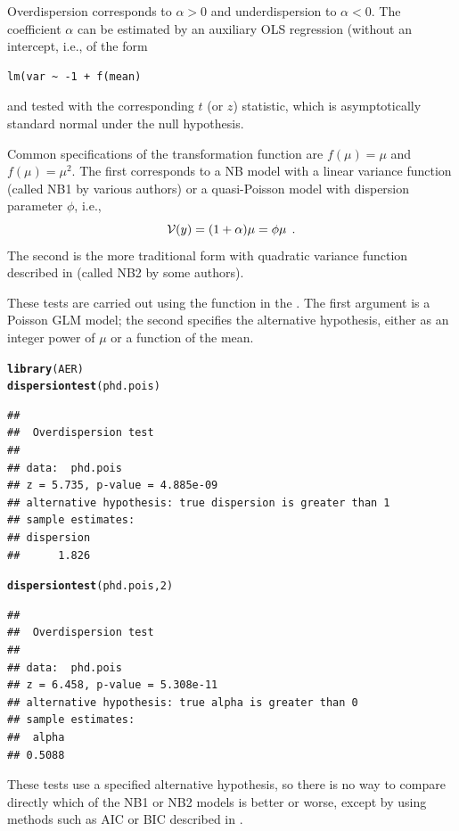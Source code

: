\documentclass[11pt]{book}\usepackage[]{graphicx}\usepackage[]{color}
\makeatletter
\newcommand{\hlnum}[1]{\textcolor[rgb]{0.686,0.059,0.569}{#1}}%
\newcommand{\hlstd}[1]{\textcolor[rgb]{0.345,0.345,0.345}{#1}}%
\newcommand{\hlkwd}[1]{\textcolor[rgb]{0.737,0.353,0.396}{\textbf{#1}}}%
\newenvironment{kframe}{%
 \def\at@end@of@kframe{}%
 \ifinner\ifhmode%
  \def\at@end@of@kframe{\end{minipage}}%
  \begin{minipage}{\columnwidth}%
 \fi\fi%
 \def\FrameCommand##1{\hskip\@totalleftmargin \hskip-\fboxsep
 \colorbox{shadecolor}{##1}\hskip-\fboxsep
     \hskip-\linewidth \hskip-\@totalleftmargin \hskip\columnwidth}%
 \MakeFramed {\advance\hsize-\width
   \@totalleftmargin\z@ \linewidth\hsize
   \@setminipage}}%
 {\par\unskip\endMakeFramed%
 \at@end@of@kframe}
\newenvironment{knitrout}{}{} %
\renewenvironment{knitrout}{\small\renewcommand{\baselinestretch}{.85}}{} %
\makeatother
\begin{document}
Overdispersion corresponds to $\alpha > 0$ and underdispersion to $\alpha < 0$. 
The coefficient $\alpha$ can be estimated by an auxiliary OLS regression (without an intercept, i.e., of the
form 
\begin{verbatim}
lm(var ~ -1 + f(mean)
\end{verbatim}
and tested with the corresponding $t$ (or $z$) statistic, which is asymptotically standard normal under the null hypothesis. 

Common specifications of the transformation function are  $f(\mu) = \mu$ and $f(\mu) = \mu^2$. The first corresponds to
a NB model with a linear variance function (called NB1 by various authors) 
or a quasi-Poisson model with dispersion parameter $\phi$, i.e.,
\begin{equation*}
\mathcal{V}(y) = (1 + \alpha) \mu = \phi \mu \:\: .
\end{equation*}
The second is the more traditional form with quadratic variance function described in 
(called NB2 by some authors).

These tests are carried out using the  function in the .
The first argument is a Poisson GLM model; the second specifies the alternative hypothesis,
either as an integer power of $\mu$ or a function of the mean.
\begin{knitrout}
\color{fgcolor}\begin{kframe}
\begin{alltt}
\hlkwd{library}\hlstd{(AER)}
\hlkwd{dispersiontest}\hlstd{(phd.pois)}
\end{alltt}
\begin{verbatim}
## 
## 	Overdispersion test
## 
## data:  phd.pois
## z = 5.735, p-value = 4.885e-09
## alternative hypothesis: true dispersion is greater than 1
## sample estimates:
## dispersion 
##      1.826
\end{verbatim}
\begin{alltt}
\hlkwd{dispersiontest}\hlstd{(phd.pois,} \hlnum{2}\hlstd{)}
\end{alltt}
\begin{verbatim}
## 
## 	Overdispersion test
## 
## data:  phd.pois
## z = 6.458, p-value = 5.308e-11
## alternative hypothesis: true alpha is greater than 0
## sample estimates:
##  alpha 
## 0.5088
\end{verbatim}
\end{kframe}
\end{knitrout}
These tests use a specified alternative hypothesis, so there is no way to compare directly which of
the NB1 or NB2 models is better or worse, except by using methods such as
AIC or BIC described in .
\end{document}
